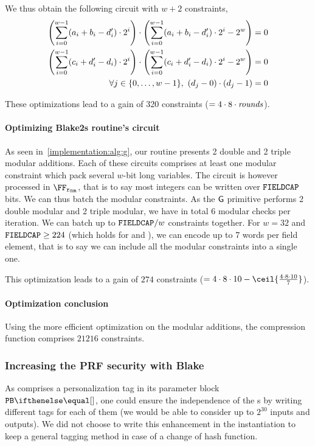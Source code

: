 We thus obtain the following circuit with $w+2$ constraints,
\begin{align*}
  \left ( \sum_{i=0}^{w - 1} ( a_i + b_i - d'_i ) \cdot 2^i \right ) \cdot \left ( \sum_{i=0}^{w - 1} ( a_i + b_i - d'_i ) \cdot 2^i - 2^w \right ) &= 0 \\
  \left ( \sum_{i=0}^{w - 1} ( c_i + d'_i - d_i ) \cdot 2^i \right ) \cdot \left ( \sum_{i=0}^{w - 1} ( c_i + d'_i - d_i ) \cdot 2^i - 2^w \right ) &= 0 \\
  \forall j \in \{{0},\ldots,{w - 1}\},\ (d_j - 0) \cdot (d_j - 1 ) &= 0
\end{align*}

These optimizations lead to a gain of 320 constraints ($=4 \cdot 8 \cdot \mathit{rounds}$).

\paragraph{Optimizing Blake2s routine's circuit}\label{implementation:efficiency:blake:optimization:batch-constraints}

As seen in~\cref{implementation:alg:g}, our routine presents 2 double and 2 triple modular additions. Each of these circuits comprises at least one modular constraint which pack several $w$-bit long variables.
The circuit is however processed in $\FFx{\rCURVE}$, that is to say most integers can be written over $\mathtt{FIELDCAP}$ bits. We can thus batch the modular constraints.
As the $\mathsf{G}$ primitive performs 2 double modular and 2 triple modular, we have in total 6 modular checks per iteration. We can batch up to $\mathtt{FIELDCAP} / w$ constraints together. For $w=32$ and $\mathtt{FIELDCAP} \geq 224$ (which holds for \BNCurve and \BLSCurve), we can encode up to 7 words per field element, that is to say we can include all the modular constraints into a single one.

This optimization leads to a gain of $274$ constraints ($= 4\cdot8\cdot10-\ceil{\frac{4\cdot8\cdot10}{7}}$).

\paragraph{Optimization conclusion}\label{implementation:efficiency:blake:optimization:conclusion}

Using the more efficient optimization on the modular additions, the  compression function comprises $21216$ constraints.

\subsubsection{Increasing the PRF security with Blake}\label{implementation:efficiency:blake-prf}

As  comprises a personalization tag in its parameter block $\blakePB{}$, one could ensure the independence of the \prf{}s by writing different tags for each of them (we would be able to consider up to $2^{30}$ inputs and outputs).
We did not choose to write this enhancement in the instantiation to keep a general tagging method in case of a change of hash function.